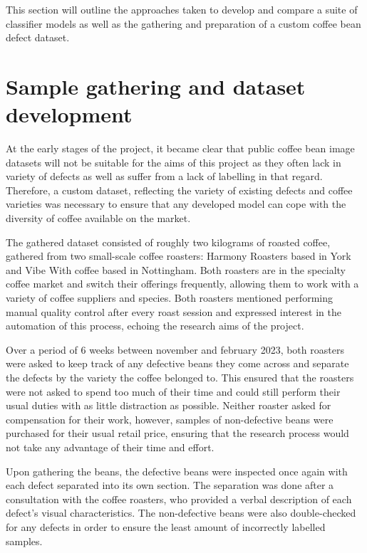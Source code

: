 This section will outline the approaches taken to develop and compare a suite of
classifier models as well as the gathering and preparation of a custom coffee
bean defect dataset.

\section{Sample gathering and dataset development}
\label{sec:sample-gathering-and-dataset-development} At the early stages of the
project, it became clear that public coffee bean image datasets will not be suitable
for the aims of this project as they often lack in variety of defects as well as
suffer from a lack of labelling in that regard. Therefore, a custom dataset,
reflecting the variety of existing defects and coffee varieties was necessary to
ensure that any developed model can cope with the diversity of coffee available
on the market.

The gathered dataset consisted of roughly two kilograms of roasted coffee, gathered
from two small-scale coffee roasters: Harmony Roasters based in York and Vibe
With coffee based in Nottingham. Both roasters are in the specialty coffee market
and switch their offerings frequently, allowing them to work with a variety of
coffee suppliers and species. Both roasters mentioned performing manual quality control
after every roast session and expressed interest in the automation of this process,
echoing the research aims of the project.

Over a period of 6 weeks between november and february 2023, both roasters were asked
to keep track of any defective beans they come across and separate the defects by
the variety the coffee belonged to. This ensured that the roasters were not
asked to spend too much of their time and could still perform their usual duties
with as little distraction as possible. Neither roaster asked for compensation for
their work, however, samples of non-defective beans were purchased for their usual
retail price, ensuring that the research process would not take any advantage of
their time and effort.

Upon gathering the beans, the defective beans were inspected once again with each
defect separated into its own section. The separation was done after a
consultation with the coffee roasters, who provided a verbal description of each
defect's visual characteristics. The non-defective beans were also double-checked
for any defects in order to ensure the least amount of incorrectly labelled
samples.

